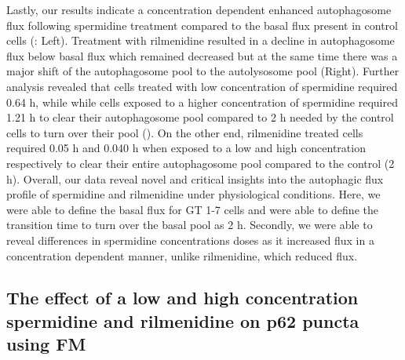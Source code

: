 {Lastly, our results indicate a concentration dependent enhanced autophagosome flux following spermidine treatment compared to the basal flux present in control cells (: Left). Treatment with rilmenidine resulted in a decline in autophagosome flux below basal flux which remained decreased but at the same time there was a major shift of the autophagosome pool to the autolysosome pool  (Right). Further analysis revealed that cells treated with low concentration of spermidine required 0.64 h, while while cells exposed to a higher concentration of spermidine required 1.21 h to clear their autophagosome pool compared to 2 h needed by the control cells to turn over their pool (). On the other end, rilmenidine treated cells required 0.05 h and 0.040 h when exposed to a low and high concentration respectively to clear their entire autophagosome pool compared to the control (2 h). Overall, our data reveal novel and critical insights into the autophagic flux profile of spermidine and rilmenidine under physiological conditions. Here, we were able to define the basal flux for GT 1-7 cells and were able to define the transition time to turn over the basal pool as 2 h. Secondly, we were able to reveal differences in spermidine concentrations doses as it increased flux in a concentration dependent manner, unlike rilmenidine, which reduced flux.

\subsection{The effect of a low and high concentration spermidine and rilmenidine on p62 puncta using FM}

}
